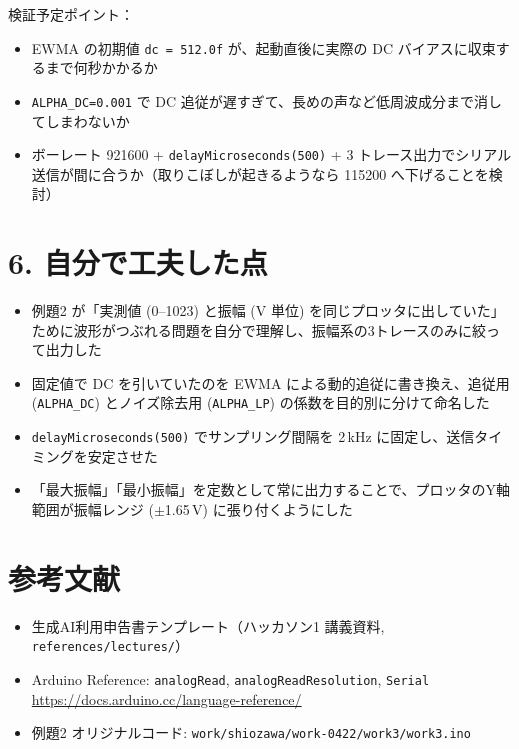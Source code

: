 \documentclass[a4paper,11pt,dvipdfmx]{jsarticle}
\begin{document}
検証予定ポイント：
\begin{itemize}
  \item EWMA の初期値 \texttt{dc = 512.0f} が、起動直後に実際の DC バイアスに収束するまで何秒かかるか
  \item \texttt{ALPHA\_DC=0.001} で DC 追従が遅すぎて、長めの声など低周波成分まで消してしまわないか
  \item ボーレート 921600 + \texttt{delayMicroseconds(500)} + 3 トレース出力でシリアル送信が間に合うか（取りこぼしが起きるようなら 115200 へ下げることを検討）
\end{itemize}

\section*{6. 自分で工夫した点}
\begin{itemize}
  \item 例題2 が「実測値 (0--1023) と振幅 (V 単位) を同じプロッタに出していた」ために波形がつぶれる問題を自分で理解し、振幅系の3トレースのみに絞って出力した
  \item 固定値で DC を引いていたのを EWMA による動的追従に書き換え、追従用 (\texttt{ALPHA\_DC}) とノイズ除去用 (\texttt{ALPHA\_LP}) の係数を目的別に分けて命名した
  \item \texttt{delayMicroseconds(500)} でサンプリング間隔を 2\,kHz に固定し、送信タイミングを安定させた
  \item 「最大振幅」「最小振幅」を定数として常に出力することで、プロッタのY軸範囲が振幅レンジ ($\pm$1.65\,V) に張り付くようにした
\end{itemize}

\section*{参考文献}
\begin{itemize}
  \item 生成AI利用申告書テンプレート（ハッカソン1 講義資料, \texttt{references/lectures/}）
  \item Arduino Reference: \texttt{analogRead}, \texttt{analogReadResolution}, \texttt{Serial} \url{https://docs.arduino.cc/language-reference/}
  \item 例題2 オリジナルコード: \texttt{work/shiozawa/work-0422/work3/work3.ino}
\end{itemize}
\end{document}
